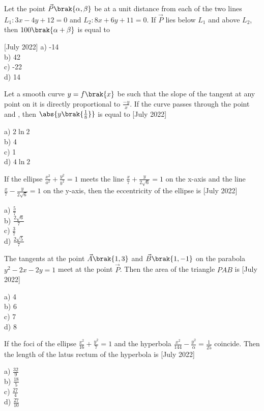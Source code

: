 \item Let the point $\vec{P}\brak{\alpha,\beta}$ be at a unit distance from each of the two lines $L_1:3x-4y+12=0$ and $L_2:8x+6y+11=0$. If $\vec{P}$ lies below $L_1$ and above $L_2$, then $100\brak{\alpha+\beta}$ is equal to 
\begin{multicols}{4} \hfill{[July 2022]}
    a) -14\\
    b) 42\\
    c) -22\\
    d) 14
\end{multicols}
\item Let a smooth curve $y=f\brak{x}$ be such that the slope of the tangent at any point  on it is directly proportional to $\frac{-y}{x}$. If the curve passes through the point  and , then $\abs{y\brak{\frac{1}{8}}}$ is equal to \hfill{[July 2022]}
\begin{multicols}{4}
    a) $2\ln 2$\\
    b) 4\\
    c) 1\\
    d) $4\ln 2$
\end{multicols}
\item If the ellipse $\frac{x^2}{a^2}+\frac{y^2}{b^2}=1$ meets the line $\frac{x}{7}+\frac{y}{2\sqrt{6}}=1$ on the x-axis and the line $\frac{x}{7}-\frac{y}{2\sqrt{6}}=1$ on the y-axis, then the eccentricity of the ellipse is \hfill{[July 2022]}
\begin{multicols}{4}
    a) $\frac{5}{7}$\\
    b) $\frac{2\sqrt{6}}{7}$\\
    c) $\frac{3}{7}$\\
    d) $\frac{2\sqrt{5}}{7}$
\end{multicols}
\item The tangents at the point $\vec{A}\brak{1,3}$ and $\vec{B}\brak{1,-1}$ on the parabola $y^2-2x-2y=1$ meet at the point $\vec{P}$. Then the area of the triangle $PAB$ is \hfill{[July 2022]}
\begin{multicols}{4}
    a) 4\\
    b) 6\\
    c) 7\\
    d) 8
\end{multicols}
\item If the foci of the ellipse $\frac{x^2}{16}+\frac{y^2}{7}=1$ and the hyperbola $\frac{x^2}{144}-\frac{y^2}{\alpha}=\frac{1}{25}$ coincide. Then the length of the latus rectum of the hyperbola is \hfill{[July 2022]}
\begin{multicols}{4}
    a) $\frac{32}{9}$\\
    b) $\frac{18}{5}$\\
    c) $\frac{27}{4}$\\
    d) $\frac{27}{10}$
\end{multicols}
